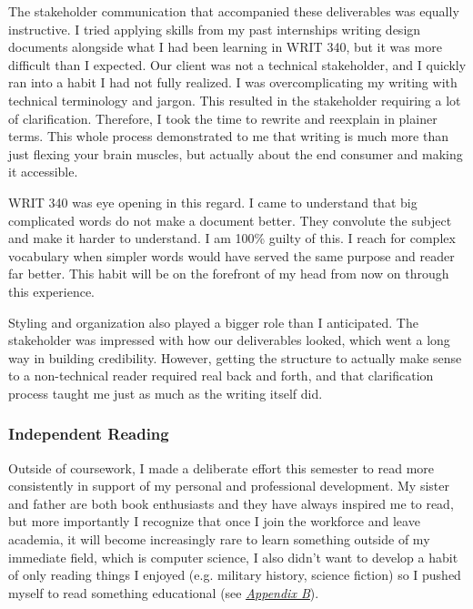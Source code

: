 \documentclass[12pt]{article}
\let\oldhyperref\hyperref
\renewcommand{\hyperref}[2][]{\oldhyperref[#1]{\textit{\uline{#2}}}}
\begin{document}
            The stakeholder communication that accompanied these deliverables was equally instructive. I tried applying skills from my past internships writing design documents alongside what I had been learning in WRIT 340, but it was more difficult than I expected. Our client was not a technical stakeholder, and I quickly ran into a habit I had not fully realized. I was overcomplicating my writing with technical terminology and jargon. This resulted in the stakeholder requiring a lot of clarification. Therefore, I took the time to rewrite and reexplain in plainer terms. This whole process demonstrated to me that writing is much more than just flexing your brain muscles, but actually about the end consumer and making it accessible.

            WRIT 340 was eye opening in this regard. I came to understand that big complicated words do not make a document better. They convolute the subject and make it harder to understand. I am 100\% guilty of this. I reach for complex vocabulary when simpler words would have served the same purpose and reader far better. This habit will be on the forefront of my head from now on through this experience.
            
            Styling and organization also played a bigger role than I anticipated. The stakeholder was impressed with how our deliverables looked, which went a long way in building credibility. However, getting the structure to actually make sense to a non-technical reader required real back and forth, and that clarification process taught me just as much as the writing itself did.

            \subsubsection{Independent Reading}
            \label{sec:independent-reading}

            Outside of coursework, I made a deliberate effort this semester to read more consistently in support of my personal and professional development. My sister and father are both book enthusiasts and they have always inspired me to read, but more importantly I recognize that once I join the workforce and leave academia, it will become increasingly rare to learn something outside of my immediate field, which is computer science, I also didn't want to develop a habit of only reading things I enjoyed (e.g. military history, science fiction) so I pushed myself to read something educational (see \hyperref[appendix:b]{Appendix B}).
\end{document}
